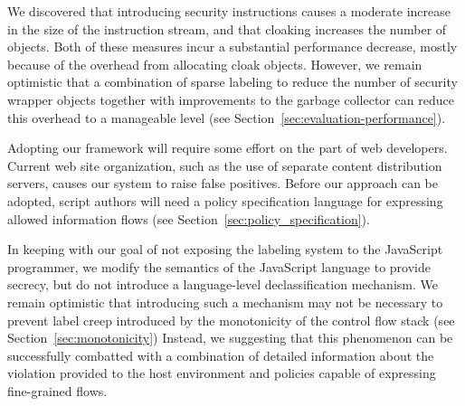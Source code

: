 We discovered that introducing security instructions causes a moderate increase in the size of the instruction stream, and that cloaking increases the number of objects.
Both of these measures incur a substantial performance decrease, mostly because of the overhead from allocating cloak objects.
However, we remain optimistic that a combination of sparse labeling to reduce the number of security wrapper objects together with improvements to the garbage collector can reduce this overhead to a manageable level (see Section~\ref{sec:evaluation-performance}).

Adopting our framework will require some effort on the part of web developers.
Current web site organization, such as the use of separate content distribution servers, causes our system to raise false positives.
Before our approach can be adopted, script authors will need a policy specification language for expressing allowed information flows (see Section~\ref{sec:policy_specification}).

\begin{comment}
\begin{jscbytecode}
|\tikzmark{mylabelStart1}|[   0] enter|\tikzmark{mylabelEnd1}|
|\tikzmark{mylabelStart2}|[   0] enter|\tikzmark{mylabelEnd2}|
|\tikzmark{mylabelStart3}|[   0] enter|\tikzmark{mylabelEnd3}|
|\tikzmark{mylabelStart4}|[   0] enter|\tikzmark{mylabelEnd4}|
|\tikzmark{mylabelStart5}|[   0] enter|\tikzmark{mylabelEnd5}|
\end{jscbytecode}

\begin{tikz}[overlay, remember picture] {
  \draw[->, thick] ($(mylabelStart1)$) -- ($(mylabelEnd5)$);
}
\end{tikz}
\end{comment}


In keeping with our goal of not exposing the labeling system to the JavaScript programmer, we modify the semantics of the JavaScript language to provide secrecy, but do not introduce a language-level declassification mechanism.
We remain optimistic that introducing such a mechanism may not be necessary to prevent label creep introduced by the monotonicity of the control flow stack (see Section~\ref{sec:monotonicity})
Instead, we suggesting that this phenomenon can be successfully combatted with a combination of detailed information about the violation provided to the host environment and policies capable of expressing fine-grained flows.



